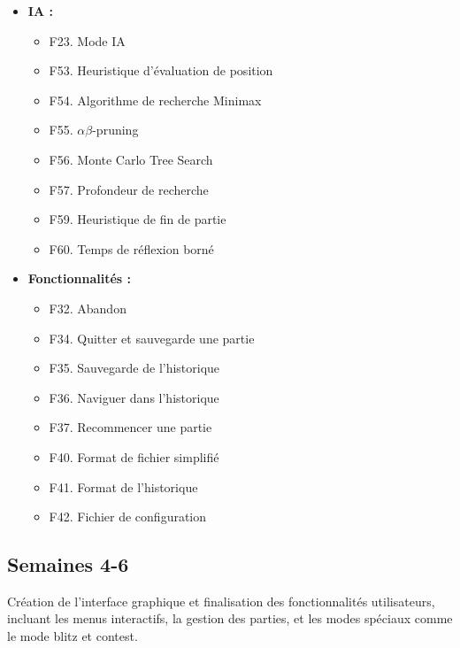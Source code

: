 \documentclass{article}
\begin{document}
\begin{itemize}
    \item \textbf{IA :}
    \begin{itemize}
        \item F23. Mode IA
        \item F53. Heuristique d'évaluation de position
        \item F54. Algorithme de recherche Minimax
        \item F55. $\alpha\beta$-pruning
        \item F56. Monte Carlo Tree Search
        \item F57. Profondeur de recherche
        \item F59. Heuristique de fin de partie
        \item F60. Temps de réflexion borné
    \end{itemize}
    \item \textbf{Fonctionnalités :}
    \begin{itemize}
        \item F32. Abandon
        \item F34. Quitter et sauvegarde une partie
        \item F35. Sauvegarde de l'historique
        \item F36. Naviguer dans l'historique
        \item F37. Recommencer une partie
        \item F40. Format de fichier simplifié
        \item F41. Format de l'historique
        \item F42. Fichier de configuration
    \end{itemize}
\end{itemize}

\subsection{Semaines 4-6}

Création de l'interface graphique et finalisation des fonctionnalités utilisateurs, incluant les menus interactifs, la gestion des parties, et les modes spéciaux comme le mode blitz et contest.
\end{document}
